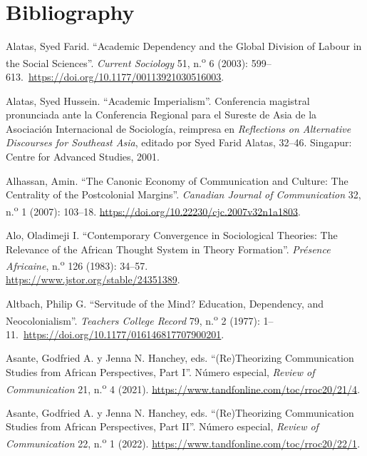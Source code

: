 \documentclass{tufte-handout}
\begin{document}
\section{Bibliography}\label{bibliography}

\begin{hangparas}{.25in}{1} 



Alatas, Syed Farid. ``Academic Dependency and the Global Division of
Labour in the Social Sciences''. \emph{Current Sociology} 51,
n.\textsuperscript{o} 6 (2003):
599--613.~\url{https://doi.org/10.1177/00113921030516003}.

Alatas, Syed Hussein. ``Academic Imperialism''. Conferencia magistral
pronunciada ante la Conferencia Regional para el Sureste de Asia de la
Asociación Internacional de Sociología, reimpresa en \emph{Reflections
on Alternative Discourses for Southeast Asia}, editado por Syed Farid
Alatas, 32--46. Singapur: Centre for Advanced Studies, 2001.

Alhassan, Amin. ``The Canonic Economy of Communication and Culture: The
Centrality of the Postcolonial Margins''. \emph{Canadian Journal of
Communication} 32, n.\textsuperscript{o} 1 (2007): 103--18.
\url{https://doi.org/10.22230/cjc.2007v32n1a1803}.

Alo, Oladimeji I. ``Contemporary Convergence in Sociological Theories:
The Relevance of the African Thought System in Theory Formation''.
\emph{Présence Africaine}, n.\textsuperscript{o} 126 (1983): 34--57.
\\\hspace{.21in}\href{http://www.jstor.org/stable/3539695}{https://www.jstor.org/stable/24351389}.

Altbach, Philip G. ``Servitude of the Mind? Education, Dependency, and
Neocolonialism''. \emph{Teachers College Record} 79,
n.\textsuperscript{o} 2 (1977):
1--11.~\url{https://doi.org/10.1177/016146817707900201}.

Asante, Godfried A. y Jenna N. Hanchey, eds. ``(Re)Theorizing
Communication Studies from African Perspectives, Part I''. Número
especial, \emph{Review of Communication} 21, n.\textsuperscript{o} 4
(2021). \url{https://www.tandfonline.com/toc/rroc20/21/4}.

Asante, Godfried A. y Jenna N. Hanchey, eds. ``(Re)Theorizing
Communication Studies from African Perspectives, Part II''. Número
especial, \emph{Review of Communication} 22, n.\textsuperscript{o} 1
(2022). \url{https://www.tandfonline.com/toc/rroc20/22/1}.


\end{hangparas}
\end{document}
